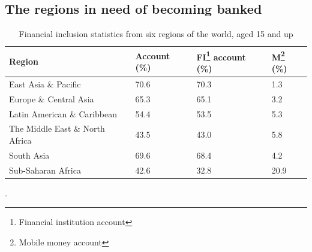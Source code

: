 \documentclass[11pt, a4paper]{article}
\begin{document}
\subsection{The regions in need of becoming banked}
\begin{table}[!ht]
\begin{tabular}{|l|l|l|l|}
\hline
\textbf{Region}             & \textbf{Account (\%)} & \textbf{FI\footnote{Financial institution account} account (\%)} & \textbf{M\footnote{Mobile money account} (\%)} \\ \hline
East Asia \& Pacific        & 70.6                  & 70.3                     & 1.3                                \\ \hline
Europe \& Central Asia      & 65.3                  & 65.1                     & 3.2                                \\ \hline
Latin American \& Caribbean & 54.4                  & 53.5                     & 5.3                                \\ \hline
The Middle East \& North Africa & 43.5                  & 43.0                     & 5.8                                \\ \hline
South Asia                  & 69.6                  & 68.4                     & 4.2                                \\ \hline
Sub-Saharan Africa          & 42.6                  & 32.8                     & 20.9                               \\ \hline
\end{tabular}
\caption{Financial inclusion statistics from six regions of the world, aged 15 and up\cite{littledata}}.
\label{tab:financial_statistics}
\end{table}
\end{document}
